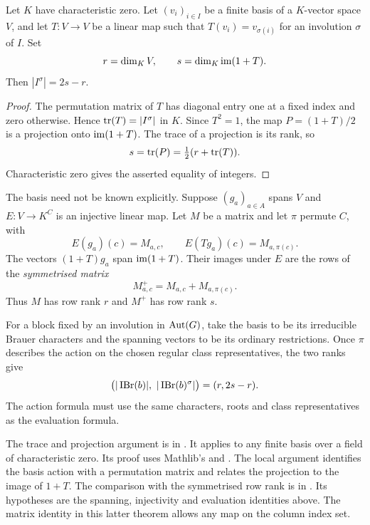 \begin{proposition}
\label{lib:computations:fixed-rank}
Let $K$ have characteristic zero. Let $(v_i)_{i\in I}$ be a finite
basis of a $K$-vector space $V$, and let $T:V\to V$ be a linear map
such that $T(v_i)=v_{\sigma(i)}$ for an involution $\sigma$ of $I$.
Set
\[
 r=\dim_K V,\qquad s=\dim_K\operatorname{im}(1+T).
\]
Then $|I^\sigma|=2s-r$.
\end{proposition}
\begin{proof}
The permutation matrix of $T$ has diagonal entry one at a fixed
index and zero otherwise. Hence $\operatorname{tr}(T)=|I^\sigma|$ in $K$.
Since $T^2=1$, the map $P=(1+T)/2$ is a projection onto $\operatorname{im}(1+T)$.
The trace of a projection is its rank, so
\[
 s=\operatorname{tr}(P)=\tfrac12(r+\operatorname{tr}(T)).
\]
Characteristic zero gives the asserted equality of integers.
\end{proof}

The basis need not be known explicitly. Suppose $(g_a)_{a\in A}$
spans $V$ and $E:V\to K^C$ is an injective linear map.
Let $M$ be a matrix and let $\pi$ permute $C$, with
\[
 E(g_a)(c)=M_{a,c},\qquad
 E(Tg_a)(c)=M_{a,\pi(c)}.
\]
The vectors $(1+T)g_a$ span $\operatorname{im}(1+T)$. Their images under $E$ are
the rows of the \emph{symmetrised matrix}
\[
 M^+_{a,c}=M_{a,c}+M_{a,\pi(c)}.
\]
Thus $M$ has row rank $r$ and $M^+$ has row rank $s$.

For a block fixed by an involution in $\operatorname{Aut}(G)$, take the basis
to be its irreducible Brauer characters and the spanning vectors
to be its ordinary restrictions. Once $\pi$ describes the action
on the chosen regular class representatives, the two ranks give
\[
 \bigl(|\IBr(b)|,\ |\IBr(b)^\sigma|\bigr)=(r,2s-r).
\]
The action formula must use the same characters, roots and class
representatives as the evaluation formula.

\begin{implementation}
The trace and projection argument is
 in
.
It applies to any finite basis over a field of characteristic zero.
Its proof uses Mathlib's  and
. The local argument identifies the
basis action with a permutation matrix and relates the projection
to the image of $1+T$.
The comparison with the symmetrised row rank is
 in
.
Its hypotheses are the spanning, injectivity and evaluation
identities above. The matrix identity in this latter theorem
allows any map on the column index set.
\end{implementation}

